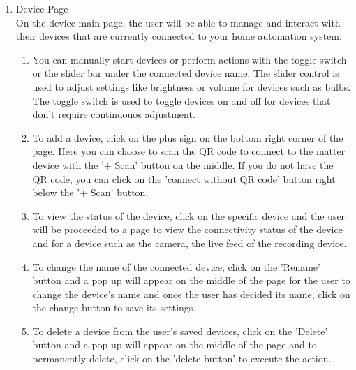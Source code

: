 \begin{enumerate}[label=\arabic*.]
    \item {\large{Device Page}}\\
          On the device main page, the user will be able to manage and interact with their devices that are currently connected to your home automation system. \\
          \begin{enumerate}[label=\alph*]
              \item You can manually start devices or perform actions with the toggle switch or the slider bar under the connected device name. The slider control is used to adjust settings like brightness or volume for devices such as bulbs. The toggle switch is used to toggle devices on and off for devices that don't require continuouos adjustment.  \\
              \item To add a device, click on the plus sign on the bottom right corner of the page. Here you can choose to scan the QR code to connect to the matter device with the '+ Scan' button on the middle. If you do not have the QR code, you can click on the 'connect without QR code' button right below the '+ Scan' button. \\
              \item To view the status of the device, click on the specific device and the user will be proceeded to a page to view the connectivity status of the device and for a device such as the camera, the live feed of the recording device. \\
              \item To change the name of the connected device, click on the 'Rename' button and a pop up will appear on the middle of the page for the user to change the device's name and once the user has decided its name, click on the change button to save its settings. \\
              \item To delete a device from the user's saved devices, click on the 'Delete' button and a pop up
                    will appear on the middle of the page and to permanently delete, click on the 'delete button' to execute the action. \\
          \end{enumerate}


\end{enumerate}
